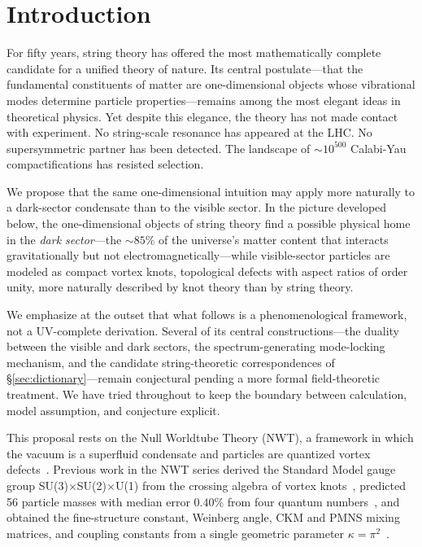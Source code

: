 \documentclass[11pt]{article}
\begin{document}
\section{Introduction}
\label{sec:intro}

For fifty years, string theory has offered the most mathematically complete candidate for a unified theory of nature.
Its central postulate---that the fundamental constituents of matter are one-dimensional objects whose vibrational modes determine particle properties---remains among the most elegant ideas in theoretical physics.
Yet despite this elegance, the theory has not made contact with experiment.
No string-scale resonance has appeared at the LHC.
No supersymmetric partner has been detected.
The landscape of $\sim 10^{500}$ Calabi-Yau compactifications has resisted selection.

We propose that the same one-dimensional intuition may apply more naturally to a dark-sector condensate than to the visible sector.
In the picture developed below, the one-dimensional objects of string theory find a possible physical home in the \emph{dark sector}---the $\sim 85\%$ of the universe's matter content that interacts gravitationally but not electromagnetically---while visible-sector particles are modeled as compact vortex knots, topological defects with aspect ratios of order unity, more naturally described by knot theory than by string theory.

We emphasize at the outset that what follows is a phenomenological framework, not a UV-complete derivation.
Several of its central constructions---the duality between the visible and dark sectors, the spectrum-generating mode-locking mechanism, and the candidate string-theoretic correspondences of \S\ref{sec:dictionary}---remain conjectural pending a more formal field-theoretic treatment.
We have tried throughout to keep the boundary between calculation, model assumption, and conjecture explicit.

This proposal rests on the Null Worldtube Theory (NWT), a framework in which the vacuum is a superfluid condensate and particles are quantized vortex defects~\cite{NWT1,NWT2,NWT3,NWT4,NWT5,NWT6,NWT7,NWT8,NWT9}.
Previous work in the NWT series derived the Standard Model gauge group SU(3)$\times$SU(2)$\times$U(1) from the crossing algebra of vortex knots~\cite{NWT8}, predicted 56 particle masses with median error $0.40\%$ from four quantum numbers~\cite{NWT6}, and obtained the fine-structure constant, Weinberg angle, CKM and PMNS mixing matrices, and coupling constants from a single geometric parameter $\kappa = \pi^2$~\cite{NWT9}.
\end{document}
